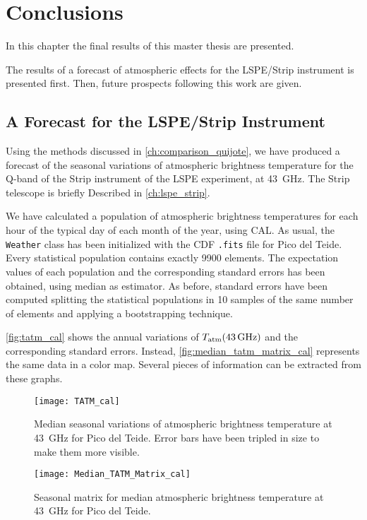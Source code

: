 \chapter{Conclusions}

In this chapter the final results of this master thesis are presented.

The results of a forecast of atmospheric effects for the LSPE/Strip
instrument is presented first. Then, future prospects following this work
are given.

\section{A Forecast for the LSPE/Strip Instrument}

Using the methods discussed in \autoref{ch:comparison_quijote}, we have
produced a forecast of the seasonal variations of atmospheric
brightness temperature for the Q-band of the Strip instrument of the LSPE
experiment, at \SI{43}{\giga\hertz}. The Strip telescope is briefly
Described in \autoref{ch:lspe_strip}.

We have calculated a population of atmospheric brightness temperatures for each
hour of the typical day of each month of the year, using CAL. As usual, the
\texttt{Weather} class has been initialized with the CDF \texttt{.fits}
file for Pico del Teide. Every statistical population contains exactly
\num{9900} elements. The expectation values of each population and the
corresponding standard errors has been obtained, using median as estimator.
As before, standard errors have been computed splitting the statistical
populations in \num{10} samples of the same number of elements and
applying a bootstrapping technique.

\autoref{fig:tatm_cal} shows the annual variations of
$T_\text{atm}\qty(\SI{43}{\giga\hertz})$ and the corresponding standard
errors. Instead, \autoref{fig:median_tatm_matrix_cal} represents the same
data in a color map. Several pieces of information can be extracted from
these graphs.

\begin{figure}
        \centering
        \texttt{[image: TATM\_cal]}
        \caption{Median seasonal variations of atmospheric brightness
        temperature at \SI{43}{\giga\hertz} for Pico del Teide. Error bars
        have been tripled in size to make them more visible.}
        \label{fig:tatm_cal}
\end{figure}

\begin{figure}
        \centering
        \texttt{[image: Median\_TATM\_Matrix\_cal]}
        \caption{Seasonal matrix for median atmospheric brightness
        temperature at \SI{43}{\giga\hertz} for Pico del Teide.}
        \label{fig:median_tatm_matrix_cal}
\end{figure}

